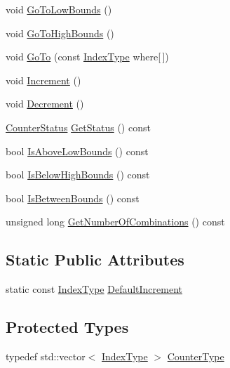 \begin{DoxyCompactItemize}
void \hyperlink{classnmr_multi_index_counter_ae5fb12e3882847ee14cee8ba21875396}{Go\+To\+Low\+Bounds} ()
\item 
void \hyperlink{classnmr_multi_index_counter_afa35aaa35926a8a1f7efcb4ccf497e1e}{Go\+To\+High\+Bounds} ()
\item 
void \hyperlink{classnmr_multi_index_counter_a8cd1eda014a543a7ba87934e4a13bccf}{Go\+To} (const \hyperlink{classnmr_multi_index_counter_a0632b941a7d18df347174b4345d73d01}{Index\+Type} where\mbox{[}$\,$\mbox{]})
\item 
void \hyperlink{classnmr_multi_index_counter_a416332f70e6bb44f19e4f6c57ca27c89}{Increment} ()
\item 
void \hyperlink{classnmr_multi_index_counter_a3109fdcc4f5dc8fcb33178aa7e54ebe9}{Decrement} ()
\item 
\hyperlink{classnmr_multi_index_counter_ad7beda3a3ee347140b4b5540770aeba5}{Counter\+Status} \hyperlink{classnmr_multi_index_counter_a5dbdd9560461b3aebfd96450628c310c}{Get\+Status} () const 
\item 
bool \hyperlink{classnmr_multi_index_counter_aea788aeae415ecef850e88d9e4b57e8b}{Is\+Above\+Low\+Bounds} () const 
\item 
bool \hyperlink{classnmr_multi_index_counter_a8c7c363007ec541a0da961bbe3ef07f6}{Is\+Below\+High\+Bounds} () const 
\item 
bool \hyperlink{classnmr_multi_index_counter_ab0a755e3c12f7040c5525e893ca363a3}{Is\+Between\+Bounds} () const 
\item 
unsigned long \hyperlink{classnmr_multi_index_counter_a531ba6fe86d8cdd83fa8b305aa4f1763}{Get\+Number\+Of\+Combinations} () const 
\end{DoxyCompactItemize}
\subsection*{Static Public Attributes}
\begin{DoxyCompactItemize}
\item 
static const \hyperlink{classnmr_multi_index_counter_a0632b941a7d18df347174b4345d73d01}{Index\+Type} \hyperlink{classnmr_multi_index_counter_ab2fdae32774037be720daec2ad869d04}{Default\+Increment}
\end{DoxyCompactItemize}
\subsection*{Protected Types}
\begin{DoxyCompactItemize}
\item 
typedef std\+::vector$<$ \hyperlink{classnmr_multi_index_counter_a0632b941a7d18df347174b4345d73d01}{Index\+Type} $>$ \hyperlink{classnmr_multi_index_counter_a6f7f42508ddcc24c957f012ffbcce57d}{Counter\+Type}
\end{DoxyCompactItemize}
